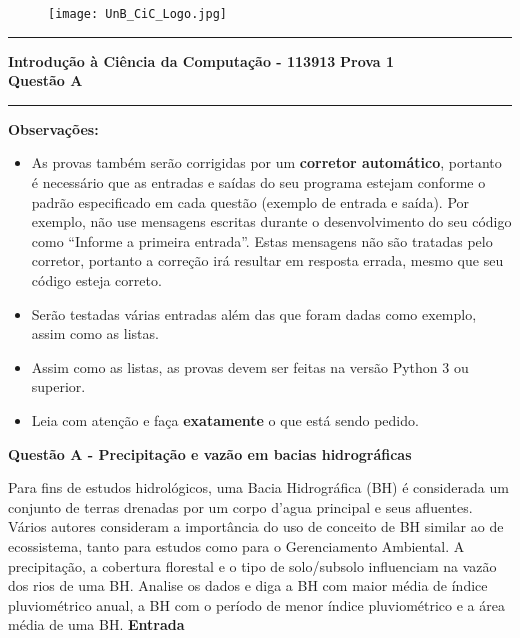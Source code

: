 \documentclass[a4paper, 12pt]{article}
\begin{document}
\begin{figure}[H]
	\texttt{[image: UnB\_CiC\_Logo.jpg]}
\end{figure}
\noindent\rule{\textwidth}{0.4pt}
\begin{center}
	\textbf{{\Large Introdução à Ciência da Computação - 113913}} \newline \newline
	\textbf{{\large Prova 1} \\
	\vspace{9pt}
	{\large Questão A}} \\
	\noindent\rule{\textwidth}{0.4pt}
	\newline
\end{center}

\textbf{{\large Observações:}}
\begin{itemize}
	\item As provas também serão corrigidas por um \textbf{corretor automático}, portanto é necessário que as entradas e saídas do seu programa estejam conforme o padrão especificado em cada questão (exemplo de entrada e saída). Por exemplo, não use mensagens escritas durante o desenvolvimento do seu código como “Informe a primeira entrada”. Estas mensagens não são tratadas pelo corretor, portanto a correção irá resultar em resposta errada, mesmo que seu código esteja correto.
	\item Serão testadas várias entradas além das que foram dadas como exemplo, assim como as listas.
	\item Assim como as listas, as provas devem ser feitas na versão Python 3 ou superior.
	\item Leia com atenção e faça \textbf{exatamente} o que está sendo pedido.
\end{itemize}
\newpage %
\begin{center}
\textbf{{\Large Questão A - Precipitação e vazão em bacias hidrográficas}}
\end{center}
\vspace{5pt}

Para fins de estudos hidrológicos, uma Bacia Hidrográfica (BH) é considerada um conjunto de terras drenadas por um corpo d’agua principal e seus afluentes. Vários autores consideram a importância do uso de conceito de BH similar ao de ecossistema, tanto para estudos como para o Gerenciamento Ambiental. A precipitação, a cobertura florestal e o tipo de solo/subsolo influenciam na vazão dos rios de uma BH. Analise os dados e diga a BH com maior média de índice pluviométrico anual, a BH com o período de menor índice pluviométrico e a área média de uma BH. 
\newline \newline
\textbf{{\large Entrada}} \newline
\end{document}
